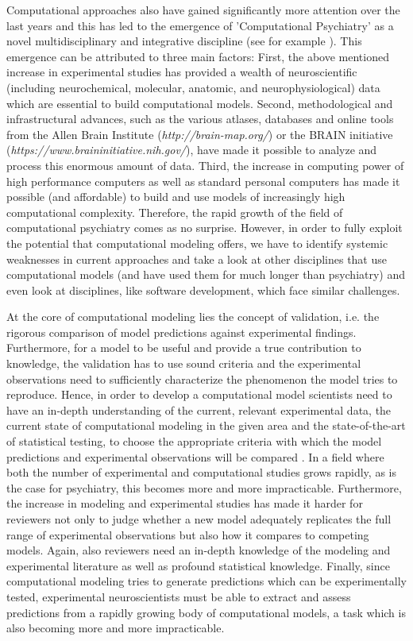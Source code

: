 \documentclass[CompPsych]{stjour}
\begin{document}
Computational approaches also have gained significantly more attention over the last years and this has led to the emergence of 
'Computational Psychiatry'
as a novel multidisciplinary and integrative discipline (see for example \cite{Montague2012,Wang2014,Friston2014,Corlett2014,Stephan2014,Adams2016}).
This emergence can be attributed to three main factors: First, the above mentioned increase in experimental studies has provided 
a wealth of neuroscientific (including neurochemical, molecular, anatomic, and neurophysiological) data which are essential to build  computational models. Second, methodological and infrastructural advances,
such as the  various atlases, databases and online tools from the Allen Brain Institute (\textit{http://brain-map.org/}) or the BRAIN initiative 
(\textit{https://www.braininitiative.nih.gov/}),
have made it possible to analyze and process this enormous amount of data. Third, the increase in computing power of high performance
computers as well as standard personal computers has made it possible (and affordable) to build and use models of increasingly high computational 
complexity. Therefore, the rapid growth of the field of computational psychiatry comes as no surprise.
However, in order to fully exploit the potential that computational modeling offers, we have to identify systemic weaknesses
in current approaches and take a look at other disciplines that use computational models (and have used them for much longer than psychiatry)
and even look at disciplines, like software development, which face similar challenges.

At the core of computational modeling lies the concept of validation, i.e. the rigorous comparison of model predictions 
against experimental findings. Furthermore, for a model to be useful and provide a true contribution to knowledge, the validation has to 
use sound criteria and the experimental observations need to sufficiently characterize the phenomenon the model tries to reproduce.
Hence, in order to develop a computational model scientists need to have an in-depth understanding of the current, relevant experimental data, 
the current state of computational modeling in the given area and the state-of-the-art of statistical testing, to choose the appropriate criteria
with which the model predictions and experimental observations will be compared \cite{Gerkin2013,Sarma2016}. In a field where both the number of experimental 
and computational
studies grows rapidly, as is the case for psychiatry, this becomes more and more impracticable.
Furthermore, the increase in modeling and experimental studies has made it harder for reviewers not only to judge whether a new model adequately 
replicates the full range of experimental observations but also how it compares to competing models. Again, also reviewers need an 
in-depth knowledge of the modeling
and experimental literature as well as profound statistical knowledge.
Finally, since computational modeling tries to generate predictions which can be experimentally tested, experimental neuroscientists must be able 
to extract and assess predictions from a rapidly growing body of computational models, a task which is also becoming more and more impracticable.
\end{document}
